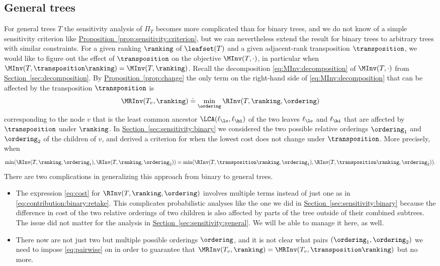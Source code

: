 \documentclass[11pt]{article}
\numberwithin{equation}{section}
\theoremstyle{definition}
\theoremstyle{plain}
\newcommand{\expref}[2]{\hyperref[#2]{#1~\ref{#2}}}
\begin{document}
\subsection{General trees}
\label{sec:connectivity:general}

For general trees $T$ the sensitivity analysis of $\Pi_T$ becomes more complicated than for binary trees, and we do not know of a simple sensitivity criterion like \expref{Proposition}{prop:sensitivity:criterion}, but we can nevertheless extend the result for binary trees to arbitrary trees with similar constraints. 
For a given ranking $\ranking$ of $\leafset(T)$ and a given adjacent-rank transposition $\transposition$, we would like to figure out the effect of $\transposition$ on the objective $\MInv(T,\cdot)$, in particular when $\MInv(T,\transposition \ranking) = \MInv(T,\ranking)$. Recall the decomposition \eqref{eq:MInv:decomposition} of $\MInv(T,\cdot)$ from \expref{Section}{sec:decomposition}. By \expref{Proposition}{prop:change} the only term on the right-hand side of \eqref{eq:MInv:decomposition} that can be affected by the transposition $\transposition$ is
\[ \MRInv(T_v,\ranking) \doteq \min_\ordering \RInv(T,\ranking,\ordering) \]
corresponding to the node $v$ that is the least common ancestor $\LCA(\ell_\lo,\ell_\hi)$ of the two leaves $\ell_\lo$ and $\ell_\hi$ that are affected by $\transposition$ under $\ranking$. In \expref{Section}{sec:sensitivity:binary} we considered the two possible relative orderings $\ordering_1$ and $\ordering_2$ of the children of $v$, and derived a criterion for when the lowest cost does not change under $\transposition$. More precisely, when 
\begin{equation}\label{eq:pairwise}
\min(\RInv(T,\ranking,\ordering_1), \RInv(T,\ranking,\ordering_2)) = \min(\RInv(T,\transposition \ranking,\ordering_1), \RInv(T,\transposition \ranking,\ordering_2)). 
\end{equation}
There are two complications in generalizing this approach from binary to general trees.
\begin{itemize}
\item 
The expression \eqref{eq:cost} for $\RInv(T,\ranking,\ordering)$ involves multiple terms instead of just one as in \eqref{eq:contribution:binary:retake}. This complicates probabilistic analyses like the one we did in \expref{Section}{sec:sensitivity:binary} because the difference in cost of the two relative orderings of two children is also affected by parts of the tree outside of their combined subtrees. The issue did not 
matter for the analysis in \expref{Section}{sec:sensitivity:general}. We will be able to manage it here, as well.
\item There now are not just two but multiple possible orderings $\ordering$, and it is not clear what pairs $(\ordering_1,\ordering_2)$ we need to impose \eqref{eq:pairwise} on in order to guarantee that $\MRInv(T_v,\ranking) = \MRInv(T_v,\transposition \ranking)$ but no more.
\end{itemize}
\end{document}
